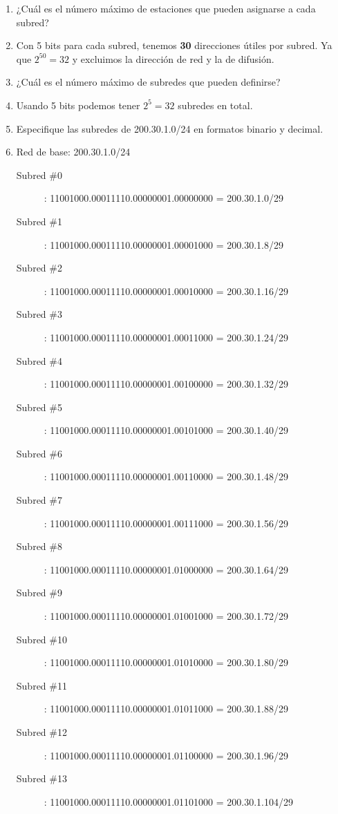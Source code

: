 \begin{enumerate}
\begin{enumerate}
        \item ¿Cu\'al es el n\'umero m\'aximo de estaciones que pueden asignarse a cada subred?
        \item[] Con 5 bits para cada subred, tenemos \textbf{30} direcciones \'utiles por subred. Ya que \(2^50=32\)
        y excluimos la direcci\'on de red y la de difusi\'on.

        \item ¿Cu\'al es el n\'umero m\'aximo de subredes que pueden definirse?
        \item[] Usando 5 bits podemos tener \(2^5=32\) subredes en total.
    
        \item Especifique las subredes de 200.30.1.0/24 en formatos binario y decimal.
        \item[] Red de base: 200.30.1.0/24
        \begin{description}
            \item[Subred \#0] : 11001000.00011110.00000001.00000000 = 200.30.1.0/29
            \item[Subred \#1] : 11001000.00011110.00000001.00001000 = 200.30.1.8/29
            \item[Subred \#2] : 11001000.00011110.00000001.00010000 = 200.30.1.16/29
            \item[Subred \#3] : 11001000.00011110.00000001.00011000 = 200.30.1.24/29
            \item[Subred \#4] : 11001000.00011110.00000001.00100000 = 200.30.1.32/29
            \item[Subred \#5] : 11001000.00011110.00000001.00101000 = 200.30.1.40/29
            \item[Subred \#6] : 11001000.00011110.00000001.00110000 = 200.30.1.48/29
            \item[Subred \#7] : 11001000.00011110.00000001.00111000 = 200.30.1.56/29
            \item[Subred \#8] : 11001000.00011110.00000001.01000000 = 200.30.1.64/29
            \item[Subred \#9] : 11001000.00011110.00000001.01001000 = 200.30.1.72/29
            \item[Subred \#10] : 11001000.00011110.00000001.01010000 = 200.30.1.80/29
            \item[Subred \#11] : 11001000.00011110.00000001.01011000 = 200.30.1.88/29
            \item[Subred \#12] : 11001000.00011110.00000001.01100000 = 200.30.1.96/29
            \item[Subred \#13] : 11001000.00011110.00000001.01101000 = 200.30.1.104/29

\end{description}
\end{enumerate}
\end{enumerate}
